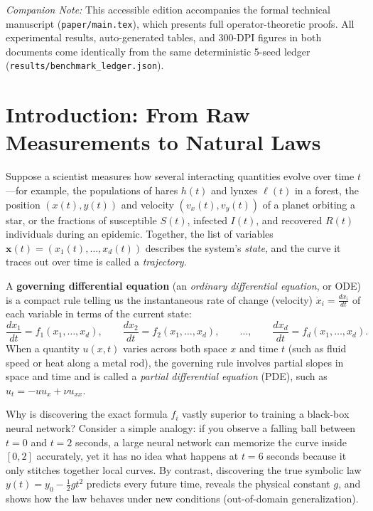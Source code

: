 \documentclass[11pt,a4paper]{article}
\begin{document}
\noindent\textit{Companion Note:} This accessible edition accompanies the formal technical manuscript (\texttt{paper/main.tex}), which presents full operator-theoretic proofs. All experimental results, auto-generated tables, and 300-DPI figures in both documents come identically from the same deterministic 5-seed ledger (\texttt{results/benchmark\_ledger.json}).

\section{Introduction: From Raw Measurements to Natural Laws}
Suppose a scientist measures how several interacting quantities evolve over time $t$—for example, the populations of hares $h(t)$ and lynxes $\ell(t)$ in a forest, the position $(x(t), y(t))$ and velocity $(v_x(t), v_y(t))$ of a planet orbiting a star, or the fractions of susceptible $S(t)$, infected $I(t)$, and recovered $R(t)$ individuals during an epidemic. Together, the list of variables $\mathbf{x}(t) = (x_1(t), \dots, x_d(t))$ describes the system's \emph{state}, and the curve it traces out over time is called a \emph{trajectory}.

A \textbf{governing differential equation} (an \emph{ordinary differential equation}, or ODE) is a compact rule telling us the instantaneous rate of change (velocity) $\dot{x}_i = \frac{dx_i}{dt}$ of each variable in terms of the current state:
\begin{equation}
  \frac{dx_1}{dt} = f_1(x_1, \dots, x_d), \qquad
  \frac{dx_2}{dt} = f_2(x_1, \dots, x_d), \qquad \dots, \qquad
  \frac{dx_d}{dt} = f_d(x_1, \dots, x_d).
\end{equation}
When a quantity $u(x,t)$ varies across both space $x$ and time $t$ (such as fluid speed or heat along a metal rod), the governing rule involves partial slopes in space and time and is called a \emph{partial differential equation} (PDE), such as $u_t = -u u_x + \nu u_{xx}$.

Why is discovering the exact formula $f_i$ vastly superior to training a black-box neural network? Consider a simple analogy: if you observe a falling ball between $t=0$ and $t=2$ seconds, a large neural network can memorize the curve inside $[0, 2]$ accurately, yet it has no idea what happens at $t=6$ seconds because it only stitches together local curves. By contrast, discovering the true symbolic law $y(t) = y_0 - \frac{1}{2}gt^2$ predicts every future time, reveals the physical constant $g$, and shows how the law behaves under new conditions (out-of-domain generalization).
\end{document}

